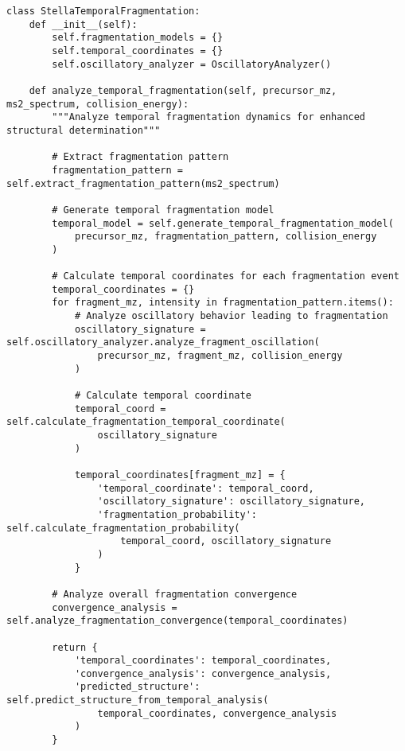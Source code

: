 \documentclass[12pt,a4paper]{article}
\begin{document}
\begin{lstlisting}[style=pythonstyle, caption=Temporal Fragmentation Analysis]
class StellaTemporalFragmentation:
    def __init__(self):
        self.fragmentation_models = {}
        self.temporal_coordinates = {}
        self.oscillatory_analyzer = OscillatoryAnalyzer()
    
    def analyze_temporal_fragmentation(self, precursor_mz, ms2_spectrum, collision_energy):
        """Analyze temporal fragmentation dynamics for enhanced structural determination"""
        
        # Extract fragmentation pattern
        fragmentation_pattern = self.extract_fragmentation_pattern(ms2_spectrum)
        
        # Generate temporal fragmentation model
        temporal_model = self.generate_temporal_fragmentation_model(
            precursor_mz, fragmentation_pattern, collision_energy
        )
        
        # Calculate temporal coordinates for each fragmentation event
        temporal_coordinates = {}
        for fragment_mz, intensity in fragmentation_pattern.items():
            # Analyze oscillatory behavior leading to fragmentation
            oscillatory_signature = self.oscillatory_analyzer.analyze_fragment_oscillation(
                precursor_mz, fragment_mz, collision_energy
            )
            
            # Calculate temporal coordinate
            temporal_coord = self.calculate_fragmentation_temporal_coordinate(
                oscillatory_signature
            )
            
            temporal_coordinates[fragment_mz] = {
                'temporal_coordinate': temporal_coord,
                'oscillatory_signature': oscillatory_signature,
                'fragmentation_probability': self.calculate_fragmentation_probability(
                    temporal_coord, oscillatory_signature
                )
            }
        
        # Analyze overall fragmentation convergence
        convergence_analysis = self.analyze_fragmentation_convergence(temporal_coordinates)
        
        return {
            'temporal_coordinates': temporal_coordinates,
            'convergence_analysis': convergence_analysis,
            'predicted_structure': self.predict_structure_from_temporal_analysis(
                temporal_coordinates, convergence_analysis
            )
        }
    

\end{lstlisting}
\end{document}
